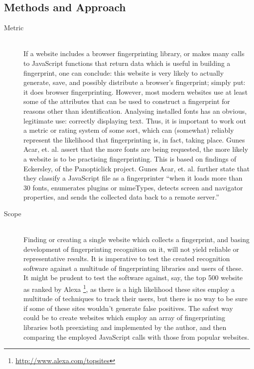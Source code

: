 \documentclass[a4paper, 12pt]{scrreprt}
\begin{document}
    \subsection{Methods and Approach}
    \begin{description}
        \item[Metric] \hfill \\
            If a website includes a browser fingerprinting library, or makes many calls to JavaScript functions that return
            data which is useful in building a fingerprint, one can conclude: this website is very likely to actually
            generate, save, and possibly distribute a browser's fingerprint; simply put: it does browser fingerprinting.
            However, most modern websites use at least some of the attributes that can be used to construct a fingerprint
            for reasons other than identification. Analysing installed fonts has an obvious, legitimate use: correctly displaying
            text. Thus, it is important to work out a metric or rating system of some sort, which can
            (somewhat) reliably represent the likelihood that fingerprinting is, in fact, taking place.
            Gunes Acar, et. al. assert that the more fonts are being requested, the more likely a website is to
            be practising fingerprinting. This is based on findings of Eckersley, of the Panopticlick project.\cite{acar2013fpdetective}
            Gunes Acar, et. al. further state that they classify a JavaScript file as a fingerprinter ``when it loads
            more than 30 fonts, enumerates plugins or mimeTypes, detects screen and navigator properties, and sends the
            collected data back to a remote server.''\cite{acar2013fpdetective}


        \item[Scope] \hfill \\
            Finding or creating a single website which collects a fingerprint, and basing development of fingerprinting
            recognition on it, will not yield reliable or representative results. It is imperative to test
            the created recognition software against a multitude of fingerprinting libraries and users of these.
            It might be prudent to test the software against, say, the top 500 website as ranked by
            Alexa \footnote{\url{http://www.alexa.com/topsites}}, as there is a high likelihood these sites employ
            a multitude of techniques to track their users, but there is no way to be sure if some of these sites wouldn't
            generate false positives.
            The safest way could be to create websites which employ an array of fingerprinting libraries both preexisting and
            implemented by the author, and then comparing the employed JavaScript calls with those from popular websites.


\end{description}
\end{document}
